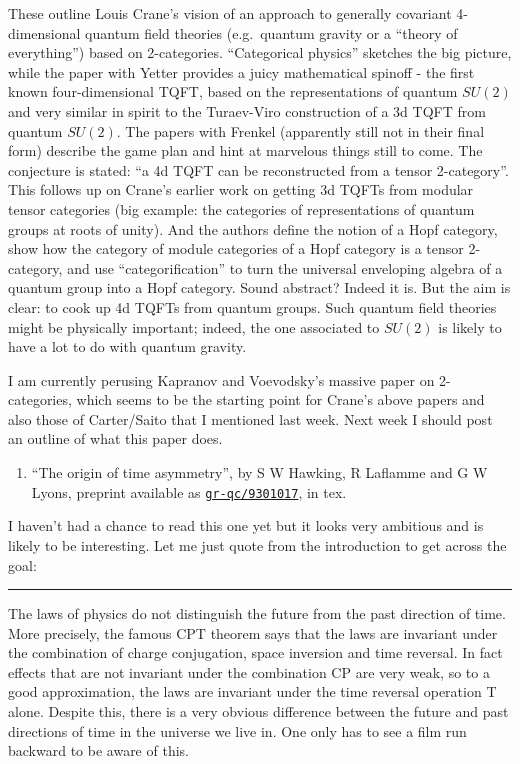 \documentclass{article}
\def\tightlist{}
\begin{document}
These outline Louis Crane's vision of an approach to generally covariant
4-dimensional quantum field theories (e.g.~quantum gravity or a ``theory
of everything'') based on 2-categories. ``Categorical physics'' sketches
the big picture, while the paper with Yetter provides a juicy
mathematical spinoff - the first known four-dimensional TQFT, based on
the representations of quantum \(SU(2)\) and very similar in spirit to
the Turaev-Viro construction of a 3d TQFT from quantum \(SU(2)\). The
papers with Frenkel (apparently still not in their final form) describe
the game plan and hint at marvelous things still to come. The conjecture
is stated: ``a 4d TQFT can be reconstructed from a tensor 2-category''.
This follows up on Crane's earlier work on getting 3d TQFTs from modular
tensor categories (big example: the categories of representations of
quantum groups at roots of unity). And the authors define the notion of
a Hopf category, show how the category of module categories of a Hopf
category is a tensor 2-category, and use ``categorification'' to turn
the universal enveloping algebra of a quantum group into a Hopf
category. Sound abstract? Indeed it is. But the aim is clear: to cook up
4d TQFTs from quantum groups. Such quantum field theories might be
physically important; indeed, the one associated to \(SU(2)\) is likely
to have a lot to do with quantum gravity.

I am currently perusing Kapranov and Voevodsky's massive paper on
2-categories, which seems to be the starting point for Crane's above
papers and also those of Carter/Saito that I mentioned last week. Next
week I should post an outline of what this paper does.

\begin{enumerate}
\def\labelenumi{\arabic{enumi})}
\setcounter{enumi}{4}
\tightlist
\item
  ``The origin of time asymmetry'', by S W Hawking, R Laflamme and G W
  Lyons, preprint available as
  \href{http://xxx.lanl.gov/abs/gr-qc/9301017}{\texttt{gr-qc/9301017}},
  in tex.
\end{enumerate}

I haven't had a chance to read this one yet but it looks very ambitious
and is likely to be interesting. Let me just quote from the introduction
to get across the goal:

\begin{center}\rule{0.5\linewidth}{0.5pt}\end{center}

The laws of physics do not distinguish the future from the past
direction of time. More precisely, the famous CPT theorem says that the
laws are invariant under the combination of charge conjugation, space
inversion and time reversal. In fact effects that are not invariant
under the combination CP are very weak, so to a good approximation, the
laws are invariant under the time reversal operation T alone. Despite
this, there is a very obvious difference between the future and past
directions of time in the universe we live in. One only has to see a
film run backward to be aware of this.
\end{document}
